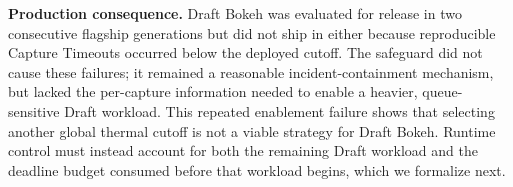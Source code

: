 \smallskip\noindent\textbf{Production consequence.}
Draft Bokeh was evaluated for release in two consecutive flagship generations
but did not ship in either because reproducible Capture Timeouts occurred below
the deployed cutoff. The safeguard did not cause these failures; it remained a
reasonable incident-containment mechanism, but lacked the per-capture
information needed to enable a heavier, queue-sensitive Draft workload. This
repeated enablement failure shows that selecting another global thermal cutoff
is not a viable strategy for Draft Bokeh. Runtime control must instead account
for both the remaining Draft workload and the deadline budget consumed before
that workload begins, which we formalize next.
